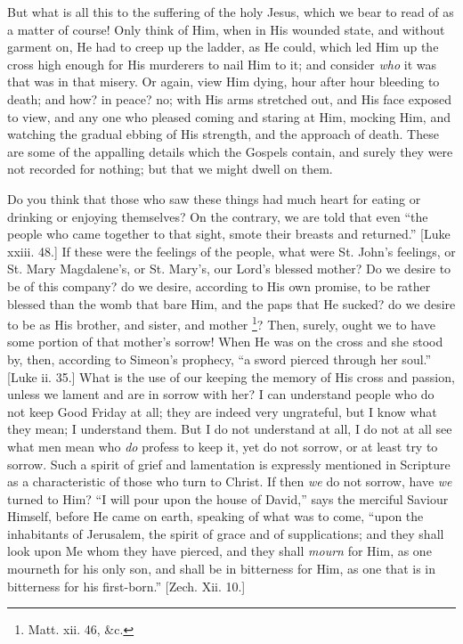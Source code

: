 But what is all this to the suffering of the holy Jesus, which we
bear to read of as a matter of course! Only think of Him, when in His
wounded state, and without garment on, He had to creep up the ladder,
as He could, which led Him up the cross high enough for His murderers
to nail Him to it; and consider \emph{who} it was that was in that
misery. Or again, view Him dying, hour after hour bleeding to death;
and how? in peace? no; with His arms stretched out, and His face
exposed to view, and any one who pleased coming and staring at Him,
mocking Him, and watching the gradual ebbing of His strength, and the
approach of death. These are some of the appalling details which the
Gospels contain, and surely they were not recorded for nothing; but
that we might dwell on them.

Do you think that those who saw these things had much heart for
eating or drinking or enjoying themselves? On the contrary, we are
told that even ``the people who came together to that sight, smote
their breasts and returned.'' [Luke xxiii. 48.] If these were the
feelings of the people, what were St. John's feelings, or St. Mary
Magdalene's, or St. Mary's, our Lord's blessed mother? Do we desire to
be of this company? do we desire, according to His own promise, to be
rather blessed than the womb that bare Him, and the paps that He
sucked? do we desire to be as His brother, and sister, and mother \footnote{Matt. xii. 46, \&c.}? Then, surely, ought we to have some portion
of that mother's sorrow! When He was on the cross and she stood by,
then, according to Simeon's prophecy, ``a sword pierced through
her soul.'' [Luke ii. 35.] What is the use of our keeping the
memory of His cross and passion, unless we lament and are in sorrow
with her? I can understand people who do not keep Good Friday at all;
they are indeed very ungrateful, but I know what they mean; I
understand them. But I do not understand at all, I do not at all see
what men mean who \emph{do} profess to keep it, yet do not sorrow, or at
least try to sorrow. Such a spirit of grief and lamentation is
expressly mentioned in Scripture as a characteristic of those who turn
to Christ. If then \emph{we} do not sorrow, have \emph{we} turned to
Him? ``I will pour upon the house of David,'' says the
merciful Saviour Himself, before He came on earth, speaking of what
was to come, ``upon the inhabitants of Jerusalem, the spirit of
grace and of supplications; and they shall look upon Me whom they have
pierced, and they shall \emph{mourn} for Him, as one mourneth for his only
son, and shall be in bitterness for Him, as one that is in bitterness
for his first-born.'' [Zech. Xii. 10.]

